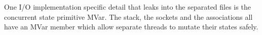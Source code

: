 One I/O implementation specific detail that leaks into the separated files is the concurrent state primitive MVar. The stack, the sockets and the associations all have an MVar member which allow separate threads to mutate their states safely.




